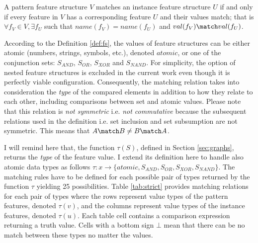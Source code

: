 \begin{definition}\label{def:fs-match}
    A pattern feature structure $V$ matches an instance feature structure $U$ if and only if every feature in $V$ has a corresponding feature $U$ and their values match; that is $ \forall f_V \in V, \exists f_U$ such that $name(f_V) = name(f_U)$ and $ val(f_V) \match val(f_U)$.
\end{definition}

According to the Definition \ref{def:fs}, the values of feature structures can be either atomic (numbers, strings, symbols, etc.), denoted $atomic$, or one of the conjunction sets: $S_{AND}$, $S_{OR}$, $S_{XOR}$ and $S_{NAND}$. For simplicity, the option of nested feature structures is excluded in the current work even though it is perfectly viable configuration. Consequently, the matching relation takes into consideration the \textit{type} of the compared elements in addition to how they relate to each other, including comparisons between set and atomic values. 
Please note that this relation is \textit{not symmetric} i.e. \textit{not commutative} because the subsequent relations used in the definition i.e. set inclusion and set subsumption are not symmetric. This means that $A \match B \neq B \match A $. 

I will remind here that, the function $\tau(S)$, defined in Section \ref{sec:graphs}, returns the \textit{type} of the feature value. I extend its definition here to handle also atomic data types as follows $\tau:x \rightarrow \{atomic, S_{AND}, S_{OR}, S_{XOR}, S_{NAND} \}$. The matching rules have to be defined for each possible pair of types returned by the function $\tau$ yielding 25 possibilities. Table \ref{tab:strict} provides matching relations for each pair of types where the rows represent value types of the pattern features, denoted $\tau(v)$, and the columns represent value types of the instance features, denoted $\tau(u)$. Each table cell contains a comparison expression returning a truth value. Cells with a bottom sign $\bot$ mean that there can be no match between these types no matter the values. 

